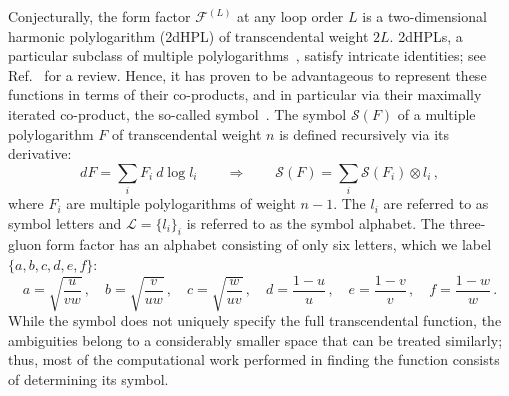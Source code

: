 \documentclass[12pt]{article}
\begin{document}
Conjecturally, the form factor $\mathcal{F}^{(L)}$ at any loop order $L$ is a two-dimensional harmonic polylogarithm (2dHPL) \citep{Gehrmann:2000zt} of transcendental weight $2L$. 2dHPLs, a particular subclass of multiple polylogarithms~\citep{Goncharov:1998kja,Goncharov:2001iea},
satisfy intricate identities; see Ref.~\citep{Duhr:2014woa} for a review. Hence, it has proven to be advantageous to represent these functions in terms of their co-products, and in particular via their maximally iterated co-product, the so-called symbol~\citep{Goncharov:2010jf}.
The symbol $\mathcal{S}(F)$ of a multiple polylogarithm $F$ of transcendental weight $n$ is defined recursively via its derivative:
\begin{equation}
    \label{eq: definiton symbol}
    dF=\sum_{i}F_i \ d\log l_i \qquad \Rightarrow \qquad\mathcal{S}(F)=\sum_{i}\mathcal{S}(F_i)\otimes  l_i\,,
\end{equation}
where $F_i$ are multiple polylogarithms of weight $n-1$. The $l_i$ are referred to as symbol letters and $\mathcal{L}=\{ l_i\}_i$ is referred to as the symbol alphabet.
%
The three-gluon form factor has an alphabet consisting of only six letters, which we label $\{a,b,c,d,e,f\}$:
\begin{equation}
\label{eq: definition abcdef}
    a=\sqrt{\frac{u}{vw}}\,,\quad
    b=\sqrt{\frac{v}{uw}}\,,\quad
    c=\sqrt{\frac{w}{uv}}\,,\quad
    d=\frac{1-u}{u}\,,\quad
    e=\frac{1-v}{v}\,,\quad
    f=\frac{1-w}{w}\,.
\end{equation}
While the symbol does not uniquely specify the full transcendental function,  the ambiguities belong to a considerably smaller space that can be treated similarly; thus, most of the computational work performed in finding the function consists of determining its symbol.
\end{document}

